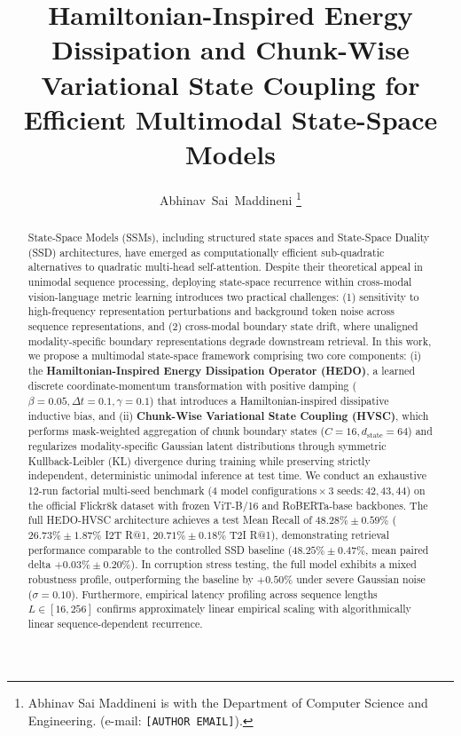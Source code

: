 \documentclass[journal]{IEEEtran}
\begin{document}
\title{Hamiltonian-Inspired Energy Dissipation and Chunk-Wise Variational State Coupling for Efficient Multimodal State-Space Models}

\author{Abhinav~Sai~Maddineni%
\thanks{Abhinav Sai Maddineni is with the Department of Computer Science and Engineering. (e-mail: \texttt{[AUTHOR EMAIL]}).}%
}

\maketitle

\begin{abstract}
State-Space Models (SSMs), including structured state spaces and State-Space Duality (SSD) architectures, have emerged as computationally efficient sub-quadratic alternatives to quadratic multi-head self-attention. Despite their theoretical appeal in unimodal sequence processing, deploying state-space recurrence within cross-modal vision-language metric learning introduces two practical challenges: (1) sensitivity to high-frequency representation perturbations and background token noise across sequence representations, and (2) cross-modal boundary state drift, where unaligned modality-specific boundary representations degrade downstream retrieval. In this work, we propose a multimodal state-space framework comprising two core components: (i) the \textbf{Hamiltonian-Inspired Energy Dissipation Operator (HEDO)}, a learned discrete coordinate-momentum transformation with positive damping ($\beta=0.05, \Delta t=0.1, \gamma=0.1$) that introduces a Hamiltonian-inspired dissipative inductive bias, and (ii) \textbf{Chunk-Wise Variational State Coupling (HVSC)}, which performs mask-weighted aggregation of chunk boundary states ($C=16, d_{\text{state}}=64$) and regularizes modality-specific Gaussian latent distributions through symmetric Kullback-Leibler (KL) divergence during training while preserving strictly independent, deterministic unimodal inference at test time. We conduct an exhaustive 12-run factorial multi-seed benchmark ($4\text{ model configurations} \times 3\text{ seeds}: 42, 43, 44$) on the official Flickr8k dataset with frozen ViT-B/16 and RoBERTa-base backbones. The full HEDO-HVSC architecture achieves a test Mean Recall of $48.28\% \pm 0.59\%$ ($26.73\% \pm 1.87\%$ I2T R@1, $20.71\% \pm 0.18\%$ T2I R@1), demonstrating retrieval performance comparable to the controlled SSD baseline ($48.25\% \pm 0.47\%$, mean paired delta $+0.03\% \pm 0.20\%$). In corruption stress testing, the full model exhibits a mixed robustness profile, outperforming the baseline by $+0.50\%$ under severe Gaussian noise ($\sigma=0.10$). Furthermore, empirical latency profiling across sequence lengths $L \in [16, 256]$ confirms approximately linear empirical scaling with algorithmically linear sequence-dependent recurrence.
\end{abstract}
\end{document}

